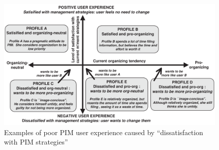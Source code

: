 
\begin{figure}[t]
	\begin{center}
		\leavevmode
		\includegraphics[width=\textwidth]{pictures/discussion/settled-unsettled-model.pdf}
	\end{center}
	\caption{Examples of poor PIM user experience caused by ``dissatisfaction with PIM strategies''}
	\label{fig:discussion:settled-unsettled-model}
\end{figure}

